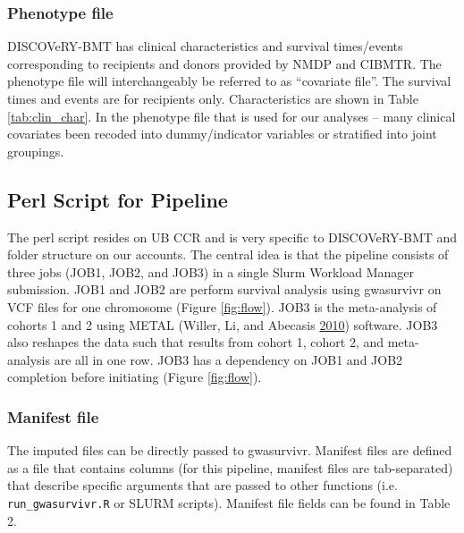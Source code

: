\documentclass[]{DissertateOSU}
\begin{document}
\subsubsection{Phenotype file}\label{phenotype-file}

DISCOVeRY-BMT has clinical characteristics and survival times/events
corresponding to recipients and donors provided by NMDP and CIBMTR. The
phenotype file will interchangeably be referred to as ``covariate
file''. The survival times and events are for recipients only.
Characteristics are shown in Table \ref{tab:clin_char}. In the phenotype
file that is used for our analyses -- many clinical covariates been
recoded into dummy/indicator variables or stratified into joint
groupings.

\subsection{Perl Script for Pipeline}\label{perl-script-for-pipeline}

The perl script resides on UB CCR and is very specific to DISCOVeRY-BMT
and folder structure on our accounts. The central idea is that the
pipeline consists of three jobs (JOB1, JOB2, and JOB3) in a single Slurm
Workload Manager submission. JOB1 and JOB2 are perform survival analysis
using gwasurvivr on VCF files for one chromosome (Figure
\ref{fig:flow}). JOB3 is the meta-analysis of cohorts 1 and 2 using
METAL (Willer, Li, and Abecasis \protect\hyperlink{ref-metal}{2010})
software. JOB3 also reshapes the data such that results from cohort 1,
cohort 2, and meta-analysis are all in one row. JOB3 has a dependency on
JOB1 and JOB2 completion before initiating (Figure \ref{fig:flow}).

\subsubsection{Manifest file}\label{manifest-file}

The imputed files can be directly passed to gwasurvivr. Manifest files
are defined as a file that contains columns (for this pipeline, manifest
files are tab-separated) that describe specific arguments that are
passed to other functions (i.e. \texttt{run\_gwasurvivr.R} or SLURM
scripts). Manifest file fields can be found in Table 2.

\end{document}
